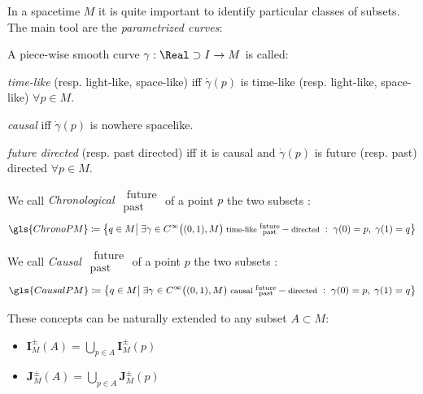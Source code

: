 \documentclass[Main]{subfiles}
\begin{document}
			In a spacetime $M$ it is quite important to identify particular classes of subsets. The main tool are the \emph{parametrized curves}:
			\begin{notationfix}

				A piece-wise smooth curve $\gamma: \Real\supset I \rightarrow M$ is called:
				\begin{compactitemize}
					\item \emph{time-like} (resp. light-like, space-like) iff $\dot{\gamma}(p)$ is time-like (resp. light-like, space-like) $\forall p \in M$.
					\item \emph{causal} iff $\dot{\gamma}(p)$ is nowhere spacelike.
					\item \emph{future directed} (resp. past directed) iff it is causal and  $\dot{\gamma}(p)$ is future (resp. past) directed $\forall p \in M$.
				\end{compactitemize}
			\end{notationfix}

			\begin{definition}
				We call \emph{Chronological $\substack{\textrm{ future}\\ \textrm{past } }$}  of a point $p$ the two subsets :
				\begin{displaymath}
					\gls{ChronoPM}\coloneqq \big\{ q \in M \big\vert \; \exists \gamma \in C^\infty\big((0,1), M\big)\;  \textrm{\footnotesize time-like } \substack{\textrm{future}\\ \textrm{past} } -\textrm{\footnotesize directed }:\; \gamma(0)=p,\; \gamma(1)=q  \big\}
				\end{displaymath}
			\end{definition}

			\begin{definition}
				We call \emph{Causal $\substack{\textrm{ future}\\ \textrm{past } }$}  of a point $p$ the two subsets :
				\begin{displaymath}
					\gls{CausalPM} \coloneqq \big\{ q \in M \big\vert \; \exists \gamma \in C^\infty\big((0,1), M\big)\; \textrm{\footnotesize causal } \substack{\textrm{future}\\ \textrm{past} } -\textrm{\footnotesize directed }:
					\; \gamma(0)=p,\; \gamma(1)=q  \big\}
				\end{displaymath}
			\end{definition}
				These concepts can be naturally extended to any subset $A \subset M$:
				\begin{itemize}
					\item $\mathbf{I}_M^\pm(A) = \bigcup_{p\in A} \mathbf{I}_M^\pm(p) $
					\item $\mathbf{J}_M^\pm(A) = \bigcup_{p\in A} \mathbf{J}_M^\pm(p) $
				\end{itemize}
\end{document}
